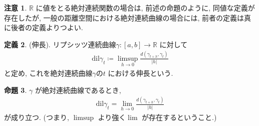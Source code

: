\documentclass[10pt, fleqn, label-section=none]{bxjsarticle}
\theoremstyle{definition}
\newtheorem{dfn}{定義}[section]
\newtheorem{prop}[dfn]{命題}
\newtheorem{remark}[dfn]{注意}
\newcommand{\abs}[1]{\left|#1\right|}
\newcommand{\dil}{\textrm{dil}}
\renewcommand{\;}{\, ; \,}
\begin{document}
\begin{remark}$\mathbb R$ に値をとる絶対連続関数の場合は, 前述の命題のように, 同値な定義が存在したが, 一般の距離空間における絶対連続曲線の場合には, 前者の定義は真に後者の定義よりつよい. 
\end{remark}

\begin{dfn}(伸長). リプシッツ連続曲線$\gamma : [a,b] \rightarrow \mathbb R$ に対して
 \begin{align*} \dil \gamma _t  \coloneqq \limsup_{h \rightarrow 0} \frac{d(\gamma_{t +h} , \gamma_t)}{\abs h}  \end{align*}
 と定め, これを絶対連続曲線$\gamma$の$t$ における伸長という. 
\end{dfn}

\begin{prop}$\gamma$ が絶対連続曲線であるとき, 
\begin{align*} \dil \gamma _t  = \lim_{h \rightarrow 0} \frac{d(\gamma_{t +h} , \gamma_t)}{\abs h}  \end{align*}
が成り立つ. (つまり, $\limsup$ より強く$\lim$ が存在するということ.) 
\end{prop}
\end{document}
